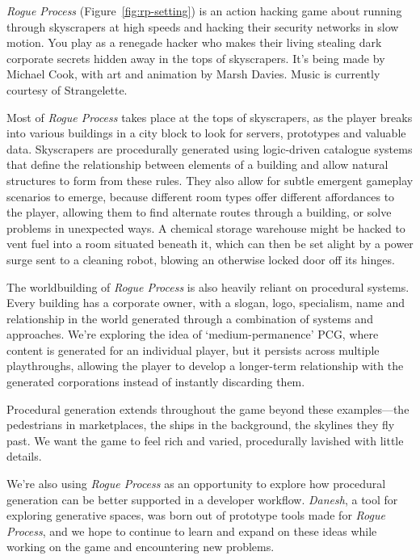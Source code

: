 \documentclass[letterpaper]{article}
\begin{document}
\textit{Rogue Process} (Figure~\ref{fig:rp-setting}) is an action hacking game about running through skyscrapers at high speeds and hacking their security networks in slow motion.
You play as a renegade hacker who makes their living stealing dark corporate secrets hidden away in the tops of skyscrapers.
It's being made by Michael Cook, with art and animation by Marsh Davies.
Music is currently courtesy of Strangelette.

Most of \textit{Rogue Process} takes place at the tops of skyscrapers, as the player breaks into various buildings in a city block to look for servers, prototypes and valuable data.
Skyscrapers are procedurally generated using logic-driven catalogue systems that define the relationship between elements of a building and allow natural structures to form from these rules.
They also allow for subtle emergent gameplay scenarios to emerge, because different room types offer different affordances to the player, allowing them to find alternate routes through a building, or solve problems in unexpected ways.
A chemical storage warehouse might be hacked to vent fuel into a room situated beneath it, which can then be set alight by a power surge sent to a cleaning robot, blowing an otherwise locked door off its hinges.

The worldbuilding of \textit{Rogue Process} is also heavily reliant on procedural systems.
Every building has a corporate owner, with a slogan, logo, specialism, name and relationship in the world generated through a combination of systems and approaches.
We're exploring the idea of `medium-permanence' PCG, where content is generated for an individual player, but it persists across multiple playthroughs, allowing the player to develop a longer-term relationship with the generated corporations instead of instantly discarding them.

Procedural generation extends throughout the game beyond these examples---the pedestrians in marketplaces, the ships in the background, the skylines they fly past.
We want the game to feel rich and varied, procedurally lavished with little details.

We're also using \textit{Rogue Process} as an opportunity to explore how procedural generation can be better supported in a developer workflow.
\textit{Danesh}, a tool for exploring generative spaces, was born out of prototype tools made for \textit{Rogue Process}, and we hope to continue to learn and expand on these ideas while working on the game and encountering new problems.
\end{document}
